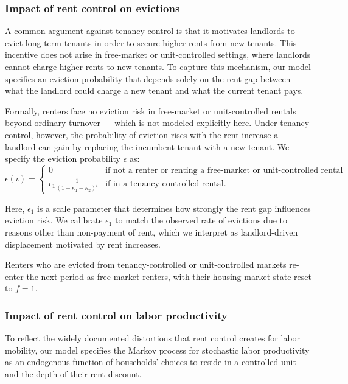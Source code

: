 \documentclass[parskip=full]{article}
\begin{document}
\subsubsection{Impact of rent control on evictions}

A common argument against tenancy control is that it motivates landlords to evict long-term tenants in order to secure higher rents from new tenants. This incentive does not arise in free-market or unit-controlled settings, where landlords cannot charge higher rents to new tenants. To capture this mechanism, our model specifies an eviction probability that depends solely on the rent gap between what the landlord could charge a new tenant and what the current tenant pays.

Formally, renters face no eviction risk in free-market or unit-controlled rentals beyond ordinary turnover — which is not modeled explicitly here. Under tenancy control, however, the probability of eviction rises with the rent increase a landlord can gain by replacing the incumbent tenant with a new tenant. We specify the eviction probability $\epsilon$ as:
\begin{equation}\label{eq:eviction}
\epsilon(\iota)=
\begin{cases}
0 & \text{if not a renter or renting a free-market or unit-controlled rental} \\ \epsilon_1 \frac{1}{\left(1 + \kappa_1 - \kappa_2 \right)^{\iota}} & \text{if in a tenancy-controlled rental}.
\end{cases}
\end{equation}

\noindent Here, $\epsilon_1$ is a scale parameter that determines how strongly the rent gap influences eviction risk. We calibrate $\epsilon_1$ to match the observed rate of evictions due to reasons other than non-payment of rent, which we interpret as landlord-driven displacement motivated by rent increases.

Renters who are evicted from tenancy-controlled or unit-controlled markets re-enter the next period as free-market renters, with their housing market state reset to $f=1$.

\subsubsection{Impact of rent control on labor productivity}

To reflect the widely documented distortions that rent control creates for labor mobility, our model specifies the Markov process for stochastic labor productivity as an endogenous function of households’ choices to reside in a controlled unit and the depth of their rent discount.
\end{document}
